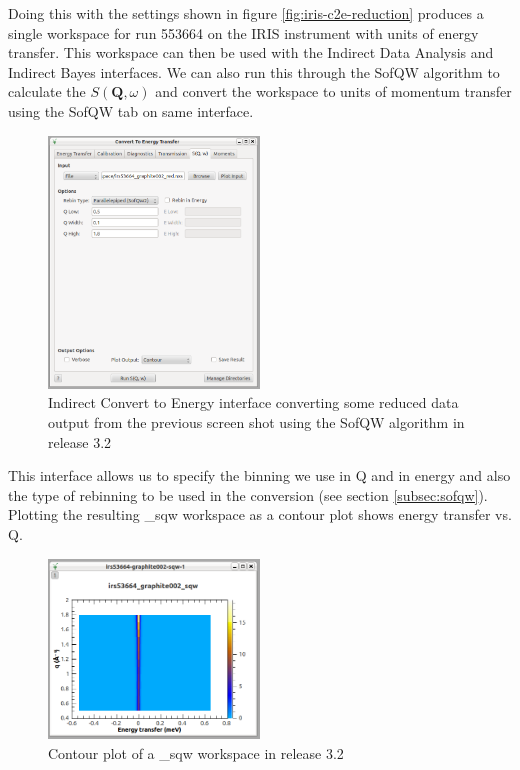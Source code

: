 \documentclass[paper=a4, fontsize=11pt]{scrartcl}	%
\numberwithin{equation}{section}															%
\numberwithin{figure}{section}																%
\numberwithin{table}{section}																%
\begin{document}
Doing this with the settings shown in figure \ref{fig:iris-c2e-reduction} produces a single workspace for run 553664 on the IRIS instrument with units of energy transfer. This workspace can then be used with the Indirect Data Analysis and Indirect Bayes interfaces. We can also run this through the SofQW algorithm to calculate the $S(\mathbf{Q},\omega)$ and convert the workspace to units of momentum transfer using the SofQW tab on same interface.

\begin{figure}[H]
\centering
\includegraphics[width=0.5\textwidth]{img/iris-c2e-sofqw.png}
\caption{Indirect Convert to Energy interface converting some reduced data output from the previous screen shot using the SofQW algorithm  in release 3.2}
\label{fig:iris-c2e-sofqw}
\end{figure}

This interface allows us to specify the binning we use in Q and in energy and also the type of rebinning to be used in the conversion (see section \ref{subsec:sofqw}). Plotting the resulting \*\_sqw workspace as a contour plot shows energy transfer vs. Q.

\begin{figure}[H]
\centering
\includegraphics[width=0.5\textwidth]{img/iris-c2e-sofqw-plot.png}
\caption{Contour plot of a \*\_sqw workspace in release 3.2}
\label{fig:iris-c2e-sofqw-plot}
\end{figure}
\end{document}
